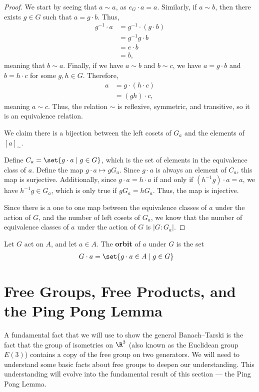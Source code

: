 \begin{proof}
  We start by seeing that $a\sim a$, as $e_G\cdot a = a$. Similarly, if $a\sim b$, then there exists $g\in G$ such that $a = g\cdot b$. Thus,
  \begin{align*}
    g^{-1}\cdot a &= g^{-1}\cdot \left(g\cdot b\right)\\
                  &= g^{-1}g\cdot b\\
                  &= e\cdot b\\
                  &= b,
  \end{align*}
  meaning that $b\sim a$. Finally, if we have $a\sim b$ and $b\sim c$, we have $a = g\cdot b$ and $b = h\cdot c$ for some $g,h\in G$. Therefore,
  \begin{align*}
    a &= g\cdot \left(h\cdot c\right)\\
      &= \left(gh\right)\cdot c,
  \end{align*}
  meaning $a\sim c$. Thus, the relation $\sim$ is reflexive, symmetric, and transitive, so it is an equivalence relation.\newline

  We claim there is a bijection between the left cosets of $G_a$ and the elements of $\left[a\right]_{\sim}$.\newline

  Define $C_a = \set{g\cdot a\mid g\in G}$, which is the set of elements in the equivalence class of $a$. Define the map $g\cdot a \mapsto gG_a$. Since $g\cdot a$ is always an element of $C_a$, this map is surjective. Additionally, since $g\cdot a = h\cdot a$ if and only if $\left(h^{-1}g\right)\cdot a = a$, we have $h^{-1}g \in G_a$, which is only true if $gG_a = hG_a$. Thus, the map is injective.\newline

  Since there is a one to one map between the equivalence classes of $a$ under the action of $G$, and the number of left cosets of $G_a$, we know that the number of equivalence classes of $a$ under the action of $G$ is $\left\vert G:G_a \right\vert$.
\end{proof}
\begin{definition}[Orbit]
  Let $G$ act on $A$, and let $a\in A$. The \textbf{orbit} of $a$ under $G$ is the set
\begin{align*}
  G\cdot a &= \set{g\cdot a\in A\mid g\in G}
\end{align*}
\end{definition}
\section{Free Groups, Free Products, and the Ping Pong Lemma}%
A fundamental fact that we will use to show the general Banach--Tarski is the fact that the group of isometries on $\R^3$ (also known as the Euclidean group $E(3)$) contains a copy of the free group on two generators. We will need to understand some basic facts about free groups to deepen our understanding. This understanding will evolve into the fundamental result of this section --- the Ping Pong Lemma.
